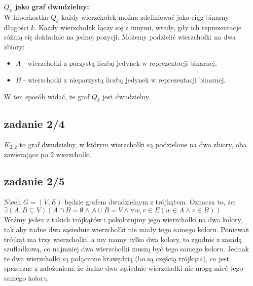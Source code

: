 \documentclass{article}
\begin{document}
\textbf{$Q_{k}$ jako graf dwudzielny:} \\
W hiperkostka $Q_k$ każdy wierzchołek można zdefiniować jako ciąg binarny długości $k$. Każdy wierzchołek łączy się z innymi, 
wtedy, gdy ich reprezentacje różnią się dokładnie na jednej pozycji. Możemy podzielić wierzchołki na dwa zbiory:
\begin{itemize}
    \item $A$ - wierzchołki z parzystą liczbą jedynek w reprezentacji binarnej,
    \item $B$ - wierzchołki z nieparzystą liczbą jedynek w reprezentacji binarnej.
\end{itemize}   
W ten sposób widać, że graf $Q_k$ jest dwudzielny.

\newpage
\subsection*{zadanie 2/4}
$K_{2, 2}$ to graf dwudzielny, w którym wierzchołki są podzielone na dwa zbiory, oba zawierające po 2 wierzchołki.

\subsection*{zadanie 2/5}
Niech $G = (V, E)$ będzie grafem dwudzielnym z trójkątem. Oznacza to, że: \\
$\exists (A, B \subseteq V) (A \cap B = \emptyset \land A \cup B = V \land \forall {w, v} \in E (w \in A \land v \in B))$ \\
Weźmy jeden z takich trójkątów i pokolorujmy jego wierzchołki na dwa kolory, tak aby żadne dwa sąsiednie wierzchołki nie miały tego samego koloru. Ponieważ trójkąt ma trzy wierzchołki, a my mamy tylko dwa kolory, to zgodnie z zasadą szufladkową, co najmniej dwa wierzchołki muszą być tego samego koloru. Jednak te dwa wierzchołki są połączone krawędzią (bo są częścią trójkąta), co jest sprzeczne z założeniem, że żadne dwa sąsiednie wierzchołki nie mogą mieć tego samego koloru. \\
\end{document}
